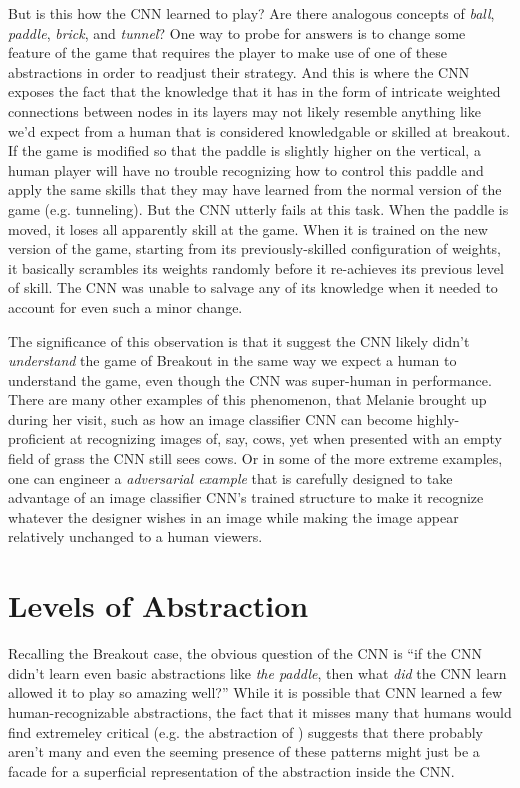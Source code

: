 \documentclass{article}
\begin{document}
But is this how the CNN learned to play? Are there analogous concepts of \textit{ball}, \textit{paddle}, \textit{brick}, and \textit{tunnel}?
One way to probe for answers is to change some feature of the game that requires the player to make use of one of these abstractions in order to readjust their strategy.
And this is where the CNN exposes the fact that the knowledge that it has in the form of intricate weighted connections between nodes in its layers may not likely resemble anything like we'd expect from a human that is considered knowledgable or skilled at breakout.
If the game is modified so that the paddle is slightly higher on the vertical, a human player will have no trouble recognizing how to control this paddle and apply the same skills that they may have learned from the normal version of the game (e.g. tunneling).
But the CNN utterly fails at this task.
When the paddle is moved, it loses all apparently skill at the game.
When it is trained on the new version of the game, starting from its previously-skilled configuration of weights, it basically scrambles its weights randomly before it re-achieves its previous level of skill.
The CNN was unable to salvage any of its knowledge when it needed to account for even such a minor change.

The significance of this observation is that it suggest the CNN likely didn't \textit{understand} the game of Breakout in the same way we expect a human to understand the game, even though the CNN was super-human in performance. There are many other examples of this phenomenon, that Melanie brought up during her visit, such as how an image classifier CNN can become highly-proficient at recognizing images of, say, cows, yet when presented with an empty field of grass the CNN still sees cows. Or in some of the more extreme examples, one can engineer a \textit{adversarial example} that is carefully designed to take advantage of an image classifier CNN's trained structure to make it recognize whatever the designer wishes in an image while making the image appear relatively unchanged to a human viewers.

\section{Levels of Abstraction}

Recalling the Breakout case, the obvious question of the CNN is ``if the CNN didn't learn even basic abstractions like \textit{the paddle}, then what \textit{did} the CNN learn allowed it to play so amazing well?'' While it is possible that CNN learned a few human-recognizable abstractions, the fact that it misses many that humans would find extremeley critical (e.g. the abstraction of ) suggests that there probably aren't many and even the seeming presence of these patterns might just be a facade for a superficial representation of the abstraction inside the CNN.
\end{document}
